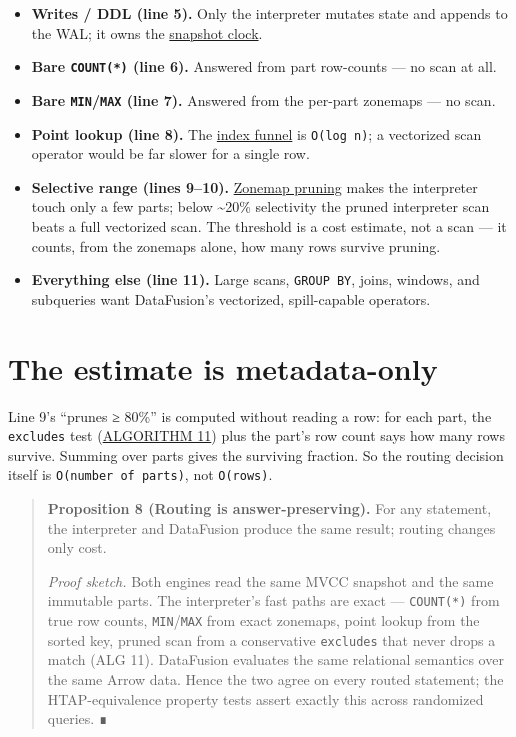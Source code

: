 \documentclass[
  11pt,
  openany]{book}
\providecommand{\tightlist}{%
  \setlength{\itemsep}{0pt}\setlength{\parskip}{0pt}}
\begin{document}
\begin{itemize}
\tightlist
\item
  \textbf{Writes / DDL (line 5).} Only the interpreter mutates state and
  appends to the WAL; it owns the \href{mvcc.md}{snapshot clock}.
\item
  \textbf{Bare \texttt{COUNT(*)} (line 6).} Answered from part
  row-counts --- no scan at all.
\item
  \textbf{Bare \texttt{MIN}/\texttt{MAX} (line 7).} Answered from the
  per-part zonemaps --- no scan.
\item
  \textbf{Point lookup (line 8).} The \href{storage.md}{index funnel} is
  \texttt{O(log\ n)}; a vectorized scan operator would be far slower for
  a single row.
\item
  \textbf{Selective range (lines 9--10).} \href{storage.md}{Zonemap
  pruning} makes the interpreter touch only a few parts; below
  \textasciitilde20\% selectivity the pruned interpreter scan beats a
  full vectorized scan. The threshold is a cost estimate, not a scan ---
  it counts, from the zonemaps alone, how many rows survive pruning.
\item
  \textbf{Everything else (line 11).} Large scans, \texttt{GROUP\ BY},
  joins, windows, and subqueries want DataFusion's vectorized,
  spill-capable operators.
\end{itemize}

\section{The estimate is
metadata-only}\label{the-estimate-is-metadata-only}

Line 9's ``prunes ≥ 80\%'' is computed without reading a row: for each
part, the \texttt{excludes} test (\href{storage.md}{ALGORITHM 11}) plus
the part's row count says how many rows survive. Summing over parts
gives the surviving fraction. So the routing decision itself is
\texttt{O(number\ of\ parts)}, not \texttt{O(rows)}.

\begin{quote}
\textbf{Proposition 8 (Routing is answer-preserving).} For any
statement, the interpreter and DataFusion produce the same result;
routing changes only cost.

\emph{Proof sketch.} Both engines read the same MVCC snapshot and the
same immutable parts. The interpreter's fast paths are exact ---
\texttt{COUNT(*)} from true row counts, \texttt{MIN}/\texttt{MAX} from
exact zonemaps, point lookup from the sorted key, pruned scan from a
conservative \texttt{excludes} that never drops a match (ALG 11).
DataFusion evaluates the same relational semantics over the same Arrow
data. Hence the two agree on every routed statement; the
HTAP-equivalence property tests assert exactly this across randomized
queries. ∎
\end{quote}
\end{document}
